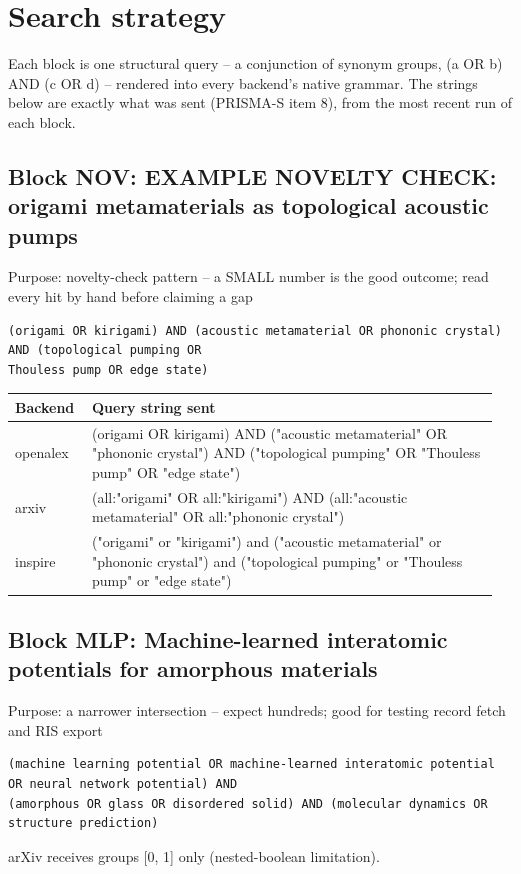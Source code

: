 \documentclass[10pt,a4paper]{article}
\begin{document}
\section*{Search strategy}
Each block is one structural query -- a conjunction of synonym groups, (a OR b) AND (c OR d) -- rendered into every backend's native grammar. The strings below are exactly what was sent (PRISMA-S item 8), from the most recent run of each block.

\subsection*{Block NOV: EXAMPLE NOVELTY CHECK: origami metamaterials as topological acoustic pumps}
Purpose: novelty-check pattern -- a SMALL number is the good outcome; read every hit by hand before claiming a gap

\begin{Verbatim}[fontsize=\scriptsize]
(origami OR kirigami) AND (acoustic metamaterial OR phononic crystal) AND (topological pumping OR 
Thouless pump OR edge state)
\end{Verbatim}
{\scriptsize\begin{longtable}{p{0.151\linewidth}p{0.804\linewidth}}
\hline
\textbf{Backend} & \textbf{Query string sent} \\ \hline
\endhead
openalex & (origami OR kirigami) AND ("acoustic metamaterial" OR "phononic crystal") AND ("topological pumping" OR "Thouless pump" OR "edge state") \\
arxiv & (all:"origami" OR all:"kirigami") AND (all:"acoustic metamaterial" OR all:"phononic crystal") \\
inspire & ("origami" or "kirigami") and ("acoustic metamaterial" or "phononic crystal") and ("topological pumping" or "Thouless pump" or "edge state") \\
\hline
\end{longtable}}
\subsection*{Block MLP: Machine-learned interatomic potentials for amorphous materials}
Purpose: a narrower intersection -- expect hundreds; good for testing record fetch and RIS export

\begin{Verbatim}[fontsize=\scriptsize]
(machine learning potential OR machine-learned interatomic potential OR neural network potential) AND 
(amorphous OR glass OR disordered solid) AND (molecular dynamics OR structure prediction)
\end{Verbatim}
arXiv receives groups {[}0, 1{]} only (nested-boolean limitation).
\end{document}
